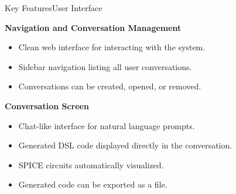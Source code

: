 \documentclass{sdqbeamer}[en]
\begin{document}
\begin{frame}[t]{Key Features}{User Interface}

\textbf{Navigation and Conversation Management}

\begin{itemize}
    \item Clean web interface for interacting with the system.
    \item Sidebar navigation listing all user conversations.
    \item Conversations can be created, opened, or removed.
\end{itemize}

\vspace{0.4cm}

\textbf{Conversation Screen}

\begin{itemize}
    \item Chat-like interface for natural language prompts.
    \item Generated DSL code displayed directly in the conversation.
    \item SPICE circuits automatically visualized.
    \item Generated code can be exported as a file.
\end{itemize}

\end{frame}
\end{document}
